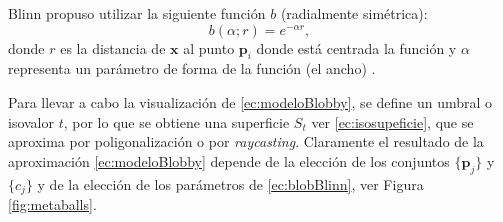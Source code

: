 Blinn propuso utilizar la siguiente función $b$ (radialmente simétrica):
\begin{equation}
 b(\alpha ; r) = e^{-\alpha r},
\label{ec:blobBlinn}
\end{equation}
donde $r$ es la distancia de $\textbf{x}$ al punto $\textbf{p}_i$ donde está centrada la función y $\alpha$ representa un parámetro de forma de la función (el ancho) .

Para llevar a cabo la visualización de \eqref{ec:modeloBlobby}, se define un umbral o isovalor $t$, por lo que se obtiene una superficie $S_t$ ver \eqref{ec:isosupeficie}, que se aproxima por poligonalización o por \emph{raycasting}. Claramente el resultado de la aproximación \eqref{ec:modeloBlobby} depende de la elección de los conjuntos $\{\textbf{p}_j\}$ y $\{c_j\}$ y de la elección de los parámetros de \eqref{ec:blobBlinn}, ver Figura \ref{fig:metaballs}.

